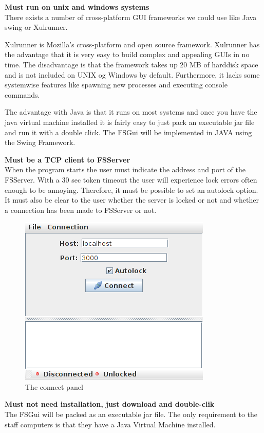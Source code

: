 \textbf{Must run on unix and windows systems} \\
There exists a number of cross-platform GUI frameworks we could use like Java swing or Xulrunner.

Xulrunner is Mozilla's cross-platform and open source framework. Xulrunner has the advantage that it is very easy to build complex and appealing GUIs in no time. The disadvantage is that the framework takes up 20 MB of harddisk space and is not included on UNIX og Windows by default. Furthermore, it lacks some systemwise features like spawning new processes and executing console commands.

The advantage with Java is that it runs on most systems and once you have the java virtual machine installed it is fairly easy to just pack an executable jar file and run it with a double click.
The FSGui will be implemented in JAVA using the Swing Framework.

\textbf{Must be a TCP client to FSServer} \\
When the program starts the user must indicate the address and port of the FSServer.
With a 30 sec token timeout the user will experience lock errors often enough to be annoying. Therefore, it must be possible to set an autolock option. It must also be clear to the user whether the server is locked or not and whether a connection has been made to FSServer or not.

\begin{figure}[h!] \centering
	\includegraphics[scale=0.7]{img/fsgui_connect}
  \caption{The connect panel}
\end{figure}

\textbf{Must not need installation, just download and double-clik} \\
The FSGui will be packed as an executable jar file. The only requirement to the staff computers is that they have a Java Virtual Machine installed.

